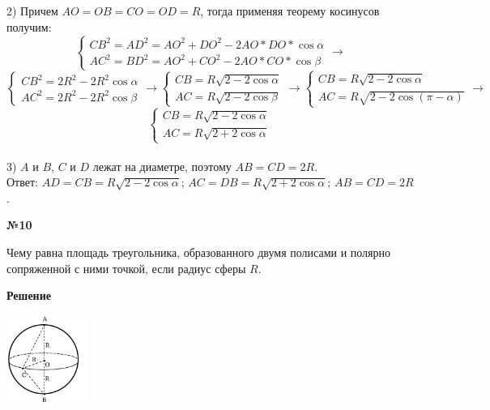     2) Причем $AO = OB = CO = OD = R$, тогда применяя теорему косинусов получим:
    \[  \begin{cases}
            CB ^ 2 = AD ^ 2 = AO ^ 2 + DO ^ 2 - 2 AO * DO *\cos \alpha\\
            AC ^ 2 = BD ^ 2 = AO ^ 2 + CO ^ 2 - 2AO * CO * \cos \beta
    \end{cases}
    \rightarrow
    \]
    \[
        \begin{cases}
            CB ^{ 2}  = 2R^2 - 2R^2\cos \alpha\\
            AC ^2 = 2R^2 - 2R^2\cos \beta
        \end{cases}
        \rightarrow
        \begin{cases}
            CB  = R\sqrt{2 - 2\cos \alpha}\\
            AC = R\sqrt{2 - 2\cos \beta}
        \end{cases}
        \rightarrow
        \begin{cases}
            CB  = R\sqrt{2 - 2\cos \alpha}\\
            AC = R\sqrt{2 - 2\cos (\pi - \alpha)}
        \end{cases}
        \rightarrow
    \]
    \[
        \begin{cases}
            CB  = R\sqrt{2 - 2\cos \alpha}\\
            AC = R\sqrt{2 + 2\cos \alpha}
        \end{cases}
    \]
    \\

    3) $A$ и $B$, $C$ и $D$ лежат на диаметре, поэтому $AB = CD = 2R$. \\

    Ответ: $AD = CB = R\sqrt {2 - 2\cos \alpha}$; $AC = DB = R\sqrt {2 + 2\cos \alpha}$; $AB = CD = 2R$.
    \begin{center}
        \textbf{№10}
    \end{center}

    Чему равна площадь треугольника, образованного двумя полисами и полярно сопряженной с ними точкой,
    если радиус сферы $R$.

    \textbf{Решение}\\

    \begin{center}
        \includegraphics[width=0.2\textwidth]{images/img6}\\
    \end{center}

